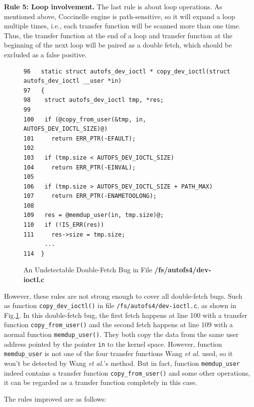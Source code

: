 \documentclass[10pt]{llncs}
\begin{document}
\textbf{Rule 5: Loop involvement.}
The last rule is about loop operations. As mentioned above, Coccinelle engine is path-sensitive, so it will expand a loop multiple times, i.e., each transfer function will be scanned more than one time. Thus, the transfer function at the end of a loop and transfer function at the beginning of the next loop will be paired as a double fetch, which should be excluded as a false positive.




\begin{figure}[t]
  \centering
\begin{lstlisting}[style=code]
96   static struct autofs_dev_ioctl * copy_dev_ioctl(struct autofs_dev_ioctl __user *in)
97   {
98    struct autofs_dev_ioctl tmp, *res;
99   
100   if (@copy_from_user(&tmp, in, AUTOFS_DEV_IOCTL_SIZE)@)
101     return ERR_PTR(-EFAULT);
102  
103   if (tmp.size < AUTOFS_DEV_IOCTL_SIZE)
104     return ERR_PTR(-EINVAL);
105  
106   if (tmp.size > AUTOFS_DEV_IOCTL_SIZE + PATH_MAX)
107     return ERR_PTR(-ENAMETOOLONG);
108  
109   res = @memdup_user(in, tmp.size)@;
110   if (!IS_ERR(res))
111     res->size = tmp.size;
	  ...
114  }   
\end{lstlisting}
  \caption{An Undetectable Double-Fetch Bug in File \textbf{/fs/autofs4/dev-ioctl.c}}
  \label{dev-ioctl}
\end{figure}




However, these rules are not strong enough to cover all double-fetch bugs. Such as function \verb:copy_dev_ioctl(): in file \verb:/fs/autofs4/dev-ioctl.c:, as shown in Fig.\ref{dev-ioctl}. In this double-fetch bug, the first fetch happens at line 100 with a transfer function \verb:copy_from_user(): and the second fetch happens at line 109 with a normal function \verb:memdup_user():. They both copy the data from the same user address pointed by the pointer \verb:in: to the kernel space. However, function \verb:memdup_user: is not one of the four transfer functions Wang \textit{et al.} used, so it won't be detected by Wang \textit{et al.}'s method. But in fact, function \verb:memdup_user: indeed contains a transfer function \verb:copy_from_user(): and some other operations, it can be regarded as a transfer function completely in this case.

The rules improved are as follows:
\end{document}
